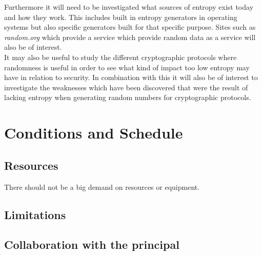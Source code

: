 \documentclass[a4paper,11pt]{report}
\begin{document}
\noindent
Furthermore it will need to be investigated what sources of entropy exist today
and how they work. This includes built in entropy generators in operating 
systems but also specific generators built for that specific purpose. Sites
such as \textit{random.org} which provide a service which provide random 
data as a service will also be of interest.
\\

\noindent
It may also be useful to study the different cryptographic protocols 
where randomness is useful in order to see what kind of impact too low entropy 
may have in relation to security. In combination with this it will also be 
of interest to investigate the weaknesses which have been discovered that were 
the result of lacking entropy when generating random numbers for cryptographic 
protocols.




\section*{Conditions and Schedule}
\subsection*{Resources}
There should not be a big demand on resources or equipment.
\subsection*{Limitations}
\subsection*{Collaboration with the principal}
\end{document}
